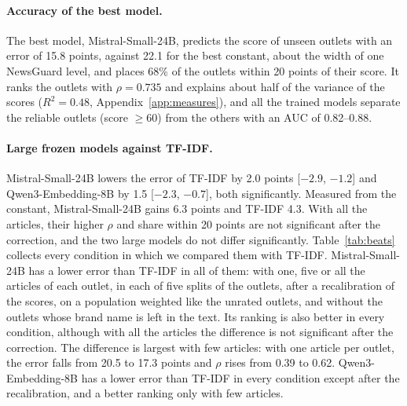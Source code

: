 \documentclass[11pt,a4paper]{article}
\begin{document}
\paragraph{Accuracy of the best model.} The best model, Mistral-Small-24B, predicts the score of unseen outlets with an
error of 15.8 points, against 22.1 for the best constant, about the width of one NewsGuard level, and places 68\% of the
outlets within 20 points of their score. It ranks the outlets with $\rho = 0.735$ and explains about half of the
variance of the scores ($R^2 = 0.48$, Appendix~\ref{app:measures}), and all the trained models separate the reliable
outlets (score $\geq 60$) from the others with an AUC of 0.82--0.88.

\paragraph{Large frozen models against TF-IDF.} Mistral-Small-24B lowers the error of TF-IDF by 2.0 points [$-2.9$,
$-1.2$] and Qwen3-Embedding-8B by 1.5 [$-2.3$, $-0.7$], both significantly. Measured from the constant, Mistral-Small-24B
gains 6.3 points and TF-IDF 4.3. With all the articles, their higher $\rho$ and share within 20 points are not
significant after the correction, and the two large models do not differ significantly. Table~\ref{tab:beats} collects
every condition in which we compared them with TF-IDF. Mistral-Small-24B has a lower error than TF-IDF in all of them:
with one, five or all the articles of each outlet, in each of five splits of the outlets, after a recalibration of the
scores, on a population weighted like the unrated outlets, and without the outlets whose brand name is left in the text.
Its ranking is also better in every condition, although with all the articles the difference is not significant after
the correction. The difference is largest with few articles: with one article per outlet, the error falls from 20.5 to
17.3 points and $\rho$ rises from 0.39 to 0.62. Qwen3-Embedding-8B has a lower error than TF-IDF in every condition
except after the recalibration, and a better ranking only with few articles.
\end{document}
